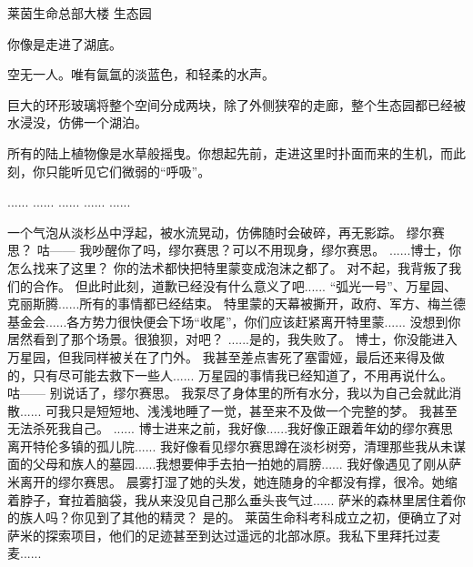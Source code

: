 \documentclass[openany]{book}
\begin{document}
莱茵生命总部大楼 生态园\par
你像是走进了湖底。\par
空无一人。唯有氤氲的淡蓝色，和轻柔的水声。\par
巨大的环形玻璃将整个空间分成两块，除了外侧狭窄的走廊，整个生态园都已经被水浸没，仿佛一个湖泊。\par
所有的陆上植物像是水草般摇曳。你想起先前，走进这里时扑面而来的生机，而此刻，你只能听见它们微弱的“呼吸”。

\begin{dialogue}
     ......
     ......
     ......
     ......
     ......\par
    一个气泡从淡杉丛中浮起，被水流晃动，仿佛随时会破碎，再无影踪。
     缪尔赛思？
     咕——
     我吵醒你了吗，缪尔赛思？可以不用现身，缪尔赛思。
     ......博士，你怎么找来了这里？
     你的法术都快把特里蒙变成泡沫之都了。
     对不起，我背叛了我们的合作。
     但此时此刻，道歉已经没有什么意义了吧......
     “弧光一号”、万星园、克丽斯腾......所有的事情都已经结束。
     特里蒙的天幕被撕开，政府、军方、梅兰德基金会......各方势力很快便会下场“收尾”，你们应该赶紧离开特里蒙......
     没想到你居然看到了那个场景。很狼狈，对吧？
     ......是的，我失败了。
     博士，你没能进入万星园，但我同样被关在了门外。
     我甚至差点害死了塞雷娅，最后还来得及做的，只有尽可能去救下一些人......
     万星园的事情我已经知道了，不用再说什么。
     咕——
     别说话了，缪尔赛思。
     我泵尽了身体里的所有水分，我以为自己会就此消散......
     可我只是短短地、浅浅地睡了一觉，甚至来不及做一个完整的梦。
     我甚至无法杀死我自己。
     ......
     博士进来之前，我好像......我好像正跟着年幼的缪尔赛思离开特伦多镇的孤儿院......
     我好像看见缪尔赛思蹲在淡杉树旁，清理那些我从未谋面的父母和族人的墓园......我想要伸手去拍一拍她的肩膀......
     我好像遇见了刚从萨米离开的缪尔赛思。
     晨雾打湿了她的头发，她连随身的伞都没有撑，很冷。她缩着脖子，耷拉着脑袋，我从来没见自己那么垂头丧气过......
     萨米的森林里居住着你的族人吗？你见到了其他的精灵？
     是的。
     莱茵生命科考科成立之初，便确立了对萨米的探索项目，他们的足迹甚至到达过遥远的北部冰原。我私下里拜托过麦麦......

\end{dialogue}
\end{document}

